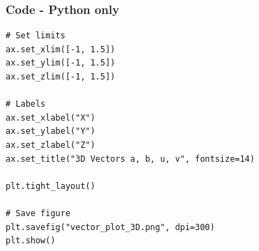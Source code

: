 \documentclass{beamer}
\theoremstyle{remark}
\numberwithin{equation}{section}
\begin{document}
\begin{frame}[fragile]
\frametitle{Code - Python only}
\begin{lstlisting}
# Set limits
ax.set_xlim([-1, 1.5])
ax.set_ylim([-1, 1.5])
ax.set_zlim([-1, 1.5])

# Labels
ax.set_xlabel("X")
ax.set_ylabel("Y")
ax.set_zlabel("Z")
ax.set_title("3D Vectors a, b, u, v", fontsize=14)

plt.tight_layout()

# Save figure
plt.savefig("vector_plot_3D.png", dpi=300)
plt.show()

\end{lstlisting}
\end{frame}
\end{document}
